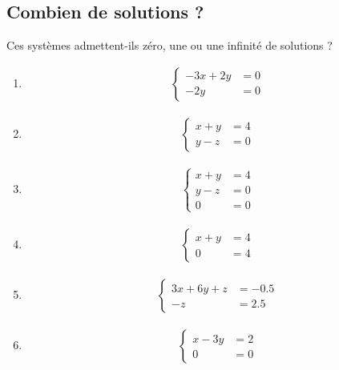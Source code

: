\documentclass[11pt,a4paper]{report}
\begin{document}
    \subsection{Combien de solutions ?}
Ces systèmes admettent-ils zéro, une ou une infinité de solutions ?

\begin{multicols}{3}
\begin{enumerate}[label=\alph*)]
  \item 
  \begin{align*}
    \begin{cases}
      -3x + 2y &= 0\\
      -2y &= 0
    \end{cases}
  \end{align*}

  \item 
  \begin{align*}
    \begin{cases}
      x + y &= 4\\
      y - z &= 0
    \end{cases}
  \end{align*}

  \item 
  \begin{align*}
    \begin{cases}
      x + y &= 4\\
      y - z &= 0\\
      0 &= 0
    \end{cases}
  \end{align*}

  \item 
  \begin{align*}
    \begin{cases}
      x + y &= 4\\
      0 &= 4
    \end{cases}
  \end{align*}

  \item 
  \begin{align*}
    \begin{cases}
      3x + 6y + z &= -0.5\\
      -z &= 2.5
    \end{cases}
  \end{align*}

  \item 
  \begin{align*}
    \begin{cases}
      x - 3y &= 2\\
      0 &= 0
    \end{cases}
  \end{align*}


\end{enumerate}
\end{multicols}
\end{document}
